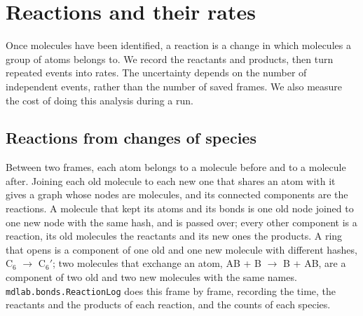 \section{Reactions and their rates}
\label{sec:ob-reactions}

Once molecules have been identified, a reaction is a change in which
molecules a group of atoms belongs to. We record the reactants and
products, then turn repeated events into rates. The uncertainty depends
on the number of independent events, rather than the number of saved
frames. We also measure the cost of doing this analysis during a run.

\subsection*{Reactions from changes of species}

Between two frames, each atom belongs to a molecule before and to a
molecule after. Joining each old molecule to each new one that shares an
atom with it gives a graph whose nodes are molecules, and its connected
components are the reactions. A molecule that kept its atoms and its
bonds is one old node joined to one new node with the same hash, and is
passed over; every other component is a reaction, its old molecules the
reactants and its new ones the products. A ring that opens is a
component of one old and one new molecule with different hashes, C$_6$
$\to$ C$_6'$; two molecules that exchange an atom, AB + B $\to$ B + AB, are
a component of two old and two new molecules with the same names.
\texttt{mdlab.bonds.ReactionLog} does this frame by frame, recording the
time, the reactants and the products of each reaction, and the counts of
each species.

